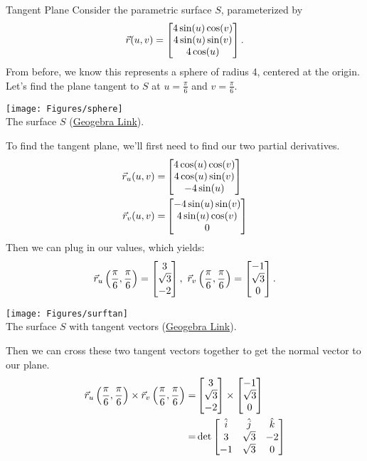 \begin{example}{Tangent Plane}
Consider the parametric surface $S$, parameterized by $$\vec{r}(u,v)=\begin{bmatrix}4\sin(u)\cos(v)\\4\sin(u)\sin(v)\\4\cos(u)\end{bmatrix}.$$ From before, we know this represents a sphere of radius 4, centered at the origin. Let's find the plane tangent to $S$ at $u=\frac{\pi}{6}$ and $v=\frac{\pi}{6}$. 
\vspace{1em}
\begin{center}
\texttt{[image: Figures/sphere]}\\
The surface $S$ (\href{https://www.geogebra.org/3d/hmgt3b7w}{Geogebra Link}).
\end{center}
\vspace{1em}
To find the tangent plane, we'll first need to find our two partial derivatives.
\begin{align*}
\vec{r}_u(u,v)=&\begin{bmatrix}4\cos(u)\cos(v)\\4\cos(u)\sin(v)\\-4\sin(u)\end{bmatrix}\\
\vec{r}_v(u,v)=&\begin{bmatrix}-4\sin(u)\sin(v)\\4\sin(u)\cos(v)\\0\end{bmatrix}\\
\end{align*}
Then we can plug in our values, which yields:
$$\vcr_u\left(\frac{\pi}{6},\frac{\pi}{6} \right)=\bmat{3\\ \sqrt{3}\\-2},\ \vcr_v\left(\frac{\pi}{6},\frac{\pi}{6} \right)=\bmat{-1\\ \sqrt{3}\\0}.$$
\begin{center}
\texttt{[image: Figures/surftan]}\\
The surface $S$ with tangent vectors (\href{https://www.geogebra.org/3d/s78y49td}{Geogebra Link}).
\end{center}
\vspace{1em}
Then we can cross these two tangent vectors together to get the normal vector to our plane.
\begin{align*}\vcr_u\left(\frac{\pi}{6},\frac{\pi}{6} \right)\times\vcr_v\left(\frac{\pi}{6},\frac{\pi}{6} \right)=&\bmat{3\\ \sqrt{3}\\-2}\times\bmat{-1\\ \sqrt{3}\\0}\\
=&\det\bmat{\vci&\vcj&\vck\\3&\sqrt{3}&-2\\-1&\sqrt{3}&0}\\

\end{align*}
\end{example}
